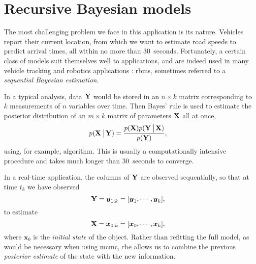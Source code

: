 \section{Recursive Bayesian models}
\label{sec:recursive-bayes}

The most challenging problem we face in this application is its \rt{} nature. Vehicles report their current location, from which we want to estimate road speeds to predict arrival times, all within no more than 30~seconds. Fortunately, a certain class of models suit themselves well to \rt{} applications, and are indeed used in many vehicle tracking and robotics applications \citep{Anderson_1979,Gustafsson_2002,Mutambara_2000}: \glspl{rbm}, sometimes referred to a \emph{sequential Bayesian estimation}.


In a typical analysis, data $\mathbf{Y}$ would be stored in an $n\times k$ matrix corresponding to $k$ measurements of $n$ variables over time. Then Bayes' rule is used to estimate the posterior distribution of an $m\times k$ matrix of parameters $\mathbf{X}$ all at once,
\begin{equation}
\label{eq:bayes}
p(\mathbf{X}\,\big|\,{}\mathbf{Y}) =
\frac{
    p(\mathbf{X})
    p(\mathbf{Y}\,\big|\,{}\mathbf{X})
}{
    p(\mathbf{Y})
},
\end{equation}
using, for example,  algorithm. This is usually a computationally intensive procedure and takes much longer than 30~seconds to converge.


In a real-time application, the columns of $\mathbf{Y}$ are observed sequentially, so that at time $t_k$ we have observed
\begin{equation}
\label{eq:bayes_y_vector}
\mathbf{Y} = \boldsymbol{y}_{1:k} = [\boldsymbol{y}_1,\cdots,\boldsymbol{y}_k],
\end{equation}
to estimate
\begin{equation}
\label{eq:bayes_x_vector}
\mathbf{X} = \boldsymbol x_{0:k} = [\boldsymbol{x}_0,\cdots,\boldsymbol{x}_k],
\end{equation}
where $\boldsymbol{x}_0$ is the \emph{initial state} of the object. Rather than refitting the full model, as would be necessary when using \gls{mcmc}, \gls{rbe} allows us to combine the previous \emph{posterior estimate} of the state with the new information.

